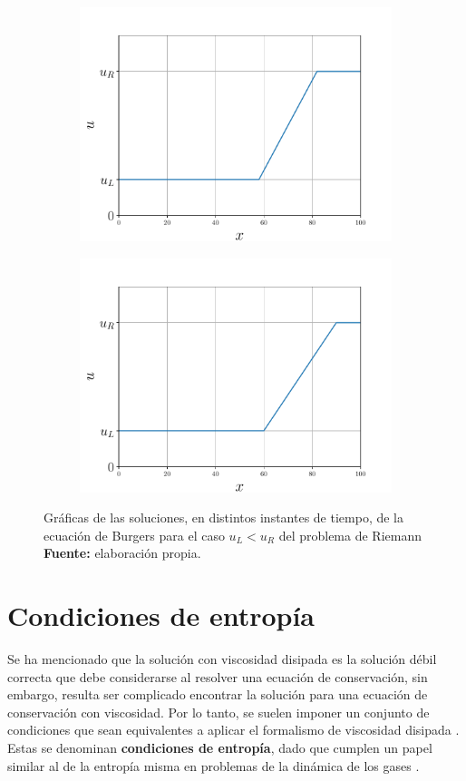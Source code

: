 \begin{figure}[ht]
\begin{subfigure}{0.5\textwidth}
		\includegraphics[width=\linewidth]{../some_plots/cap1/graficas/riemannRL-0.8.pdf}
	\end{subfigure}
	\begin{subfigure}{0.5\textwidth}
		\centering
		\includegraphics[width=\linewidth]{../some_plots/cap1/graficas/riemannRL-1.pdf}
	\end{subfigure}
	\caption{Gráficas de las soluciones, en distintos instantes de tiempo, de la ecuación de Burgers para el caso $u_L < u_R$ del problema de Riemann \textbf{Fuente:} elaboración propia.}
	\label{fig:rarefaccion}
\end{figure}
\section{Condiciones de entropía}
Se ha mencionado que la solución con viscosidad disipada es la solución débil correcta que debe considerarse al resolver una ecuación de conservación, sin embargo, resulta ser complicado encontrar la solución para una ecuación de conservación con viscosidad. Por lo tanto, se suelen imponer un conjunto de condiciones que sean equivalentes a aplicar el formalismo de viscosidad disipada \cite{Leveque}. Estas se denominan \textbf{condiciones de entropía}, dado que cumplen un papel similar al de la entropía misma en problemas de la dinámica de los gases \cite{Leveque}.

